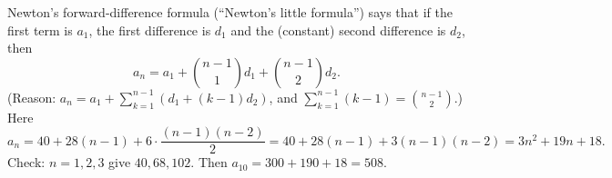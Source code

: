 Newton's forward-difference formula (``Newton's little formula'') says that if the first term is $a_1$, the first difference is $d_1$ and the (constant) second difference is $d_2$, then
\[
a_n=a_1+\binom{n-1}{1}d_1+\binom{n-1}{2}d_2 .
\]
(Reason: $a_n=a_1+\sum_{k=1}^{n-1}\left(d_1+(k-1)d_2\right)$, and $\sum_{k=1}^{n-1}(k-1)=\binom{n-1}{2}$.) Here
\[
a_n=40+28(n-1)+6\cdot\dfrac{(n-1)(n-2)}{2}=40+28(n-1)+3(n-1)(n-2)=\boxed{3n^2+19n+18}.
\]
Check: $n=1,2,3$ give $40,68,102$. Then $a_{10}=300+190+18=\boxed{508}$.

